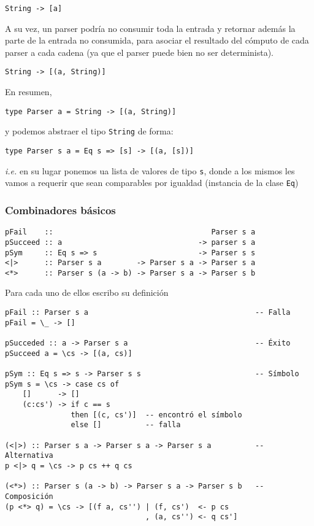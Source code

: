 \documentclass{article}
\newcommand{\imp}[1]{\textcolor{color1}{#1}}
\begin{document}
\begin{lstlisting}
String -> [a]
\end{lstlisting}

A su vez, un parser podría no consumir toda la entrada y retornar además la parte de la entrada no consumida, para asociar el resultado del cómputo de cada parser a cada cadena (ya que el parser puede bien no ser determinista).

\begin{lstlisting}
String -> [(a, String)]
\end{lstlisting}

En resumen, 

\begin{lstlisting}
type Parser a = String -> [(a, String)]
\end{lstlisting}

y podemos abstraer el tipo \imp{\texttt{String}} de forma:

\begin{lstlisting}
type Parser s a = Eq s => [s] -> [(a, [s])]
\end{lstlisting}

\emph{i.e.} en su lugar ponemos ua lista de valores de tipo \imp{\texttt{s}}, donde a los mismos les vamos a requerir que sean comparables por igualdad (instancia de la clase \imp{\texttt{Eq}})

\subsubsection{Combinadores básicos}

\begin{lstlisting}
pFail    ::                                    Parser s a
pSucceed :: a                               -> parser s a
pSym     :: Eq s => s                       -> Parser s s
<|>      :: Parser s a        -> Parser s a -> Parser s a
<*>      :: Parser s (a -> b) -> Parser s a -> Parser s b
\end{lstlisting}

Para cada uno de ellos escribo su definición

\begin{lstlisting}
pFail :: Parser s a                                      -- Falla
pFail = \_ -> []

pSucceded :: a -> Parser s a                             -- Éxito
pSucceed a = \cs -> [(a, cs)]

pSym :: Eq s => s -> Parser s s                          -- Símbolo
pSym s = \cs -> case cs of
    []      -> []
    (c:cs') -> if c == s
               then [(c, cs')]  -- encontró el símbolo
               else []          -- falla

(<|>) :: Parser s a -> Parser s a -> Parser s a          -- Alternativa
p <|> q = \cs -> p cs ++ q cs

(<*>) :: Parser s (a -> b) -> Parser s a -> Parser s b   -- Composición
(p <*> q) = \cs -> [(f a, cs'') | (f, cs')  <- p cs
                                , (a, cs'') <- q cs']
\end{lstlisting}
\end{document}
